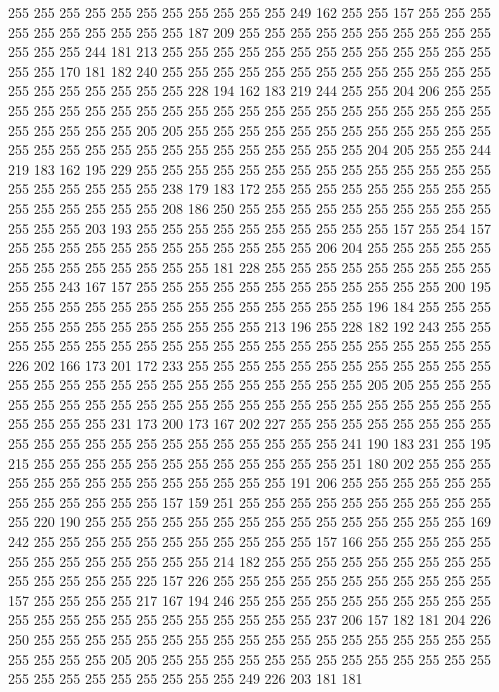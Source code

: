 255 255 255 255 255 255 255 255 255 255 255 249 162 255 255 157 255 255 255 255
255 255 255 255 255 255 187 209 255 255 255 255 255 255 255 255 255 255 255 255
255 244 181 213 255 255 255 255 255 255 255 255 255 255 255 255 255 255 255 170
181 182 240 255 255 255 255 255 255 255 255 255 255 255 255 255 255 255 255 255
255 255 255 228 194 162 183 219 244 255 255 204 206 255 255 255 255 255 255 255
255 255 255 255 255 255 255 255 255 255 255 255 255 255 255 255 255 255 255 205
205 255 255 255 255 255 255 255 255 255 255 255 255 255 255 255 255 255 255 255
255 255 255 255 255 255 255 204 205 255 255 244 219 183 162 195 229 255 255 255
255 255 255 255 255 255 255 255 255 255 255 255 255 255 255 255 255 238 179 183
172 255 255 255 255 255 255 255 255 255 255 255 255 255 255 255 208 186 250 255
255 255 255 255 255 255 255 255 255 255 255 255 203 193 255 255 255 255 255 255
255 255 255 255 157 255 254 157 255 255 255 255 255 255 255 255 255 255 255 255
206 204 255 255 255 255 255 255 255 255 255 255 255 255 255 181 228 255 255 255
255 255 255 255 255 255 255 255 243 167 157 255 255 255 255 255 255 255 255 255
255 255 255 200 195 255 255 255 255 255 255 255 255 255 255 255 255 255 255 196
184 255 255 255 255 255 255 255 255 255 255 255 255 255 213 196 255 228 182 192
243 255 255 255 255 255 255 255 255 255 255 255 255 255 255 255 255 255 255 255
255 255 226 202 166 173 201 172 233 255 255 255 255 255 255 255 255 255 255 255
255 255 255 255 255 255 255 255 255 255 255 255 255 255 255 205 205 255 255 255
255 255 255 255 255 255 255 255 255 255 255 255 255 255 255 255 255 255 255 255
255 255 255 231 173 200 173 167 202 227 255 255 255 255 255 255 255 255 255 255
255 255 255 255 255 255 255 255 255 255 255 241 190 183 231 255 195 215 255 255
255 255 255 255 255 255 255 255 255 255 251 180 202 255 255 255 255 255 255 255
255 255 255 255 255 255 255 191 206 255 255 255 255 255 255 255 255 255 255 255
255 157 159 251 255 255 255 255 255 255 255 255 255 255 255 220 190 255 255 255
255 255 255 255 255 255 255 255 255 255 255 255 169 242 255 255 255 255 255 255
255 255 255 255 255 157 166 255 255 255 255 255 255 255 255 255 255 255 255 255
214 182 255 255 255 255 255 255 255 255 255 255 255 255 255 255 225 157 226 255
255 255 255 255 255 255 255 255 255 255 157 255 255 255 255 217 167 194 246 255
255 255 255 255 255 255 255 255 255 255 255 255 255 255 255 255 255 255 255 255
255 237 206 157 182 181 204 226 250 255 255 255 255 255 255 255 255 255 255 255
255 255 255 255 255 255 255 255 255 255 255 205 205 255 255 255 255 255 255 255
255 255 255 255 255 255 255 255 255 255 255 255 255 255 255 249 226 203 181 181
